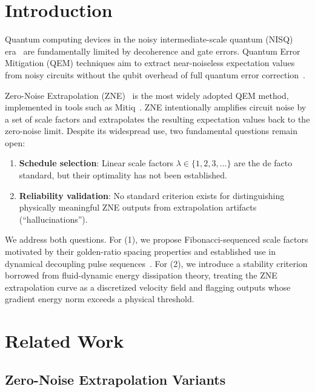 \documentclass[twocolumn,showpacs,preprintnumbers,amsmath,amssymb,prl]{revtex4-2}
\begin{document}
\section{Introduction}
\label{sec:intro}

Quantum computing devices in the noisy intermediate-scale quantum (NISQ)
era~\cite{Preskill2018} are fundamentally limited by decoherence and gate
errors. Quantum Error Mitigation (QEM) techniques aim to extract
near-noiseless expectation values from noisy circuits without the qubit
overhead of full quantum error correction~\cite{Temme2017, Endo2018}.

Zero-Noise Extrapolation (ZNE)~\cite{Li2017, Temme2017} is the most
widely adopted QEM method, implemented in tools such as
Mitiq~\cite{LaRose2022}. ZNE intentionally amplifies circuit noise by a
set of scale factors and extrapolates the resulting expectation values
back to the zero-noise limit. Despite its widespread use, two fundamental
questions remain open:

\begin{enumerate}
    \item \textbf{Schedule selection}: Linear scale factors
    $\lambda \in \{1, 2, 3, \ldots\}$ are the de facto standard, but
    their optimality has not been established.
    \item \textbf{Reliability validation}: No standard criterion exists
    for distinguishing physically meaningful ZNE outputs from extrapolation
    artifacts (``hallucinations'').
\end{enumerate}

We address both questions. For (1), we propose Fibonacci-sequenced scale
factors motivated by their golden-ratio spacing properties and established
use in dynamical decoupling pulse sequences~\cite{Viola1998, Ezzell2023}.
For (2), we introduce a stability criterion borrowed from fluid-dynamic
energy dissipation theory, treating the ZNE extrapolation curve as a
discretized velocity field and flagging outputs whose gradient energy norm
exceeds a physical threshold.


\section{Related Work}
\label{sec:related}

\subsection{Zero-Noise Extrapolation Variants}
\end{document}
